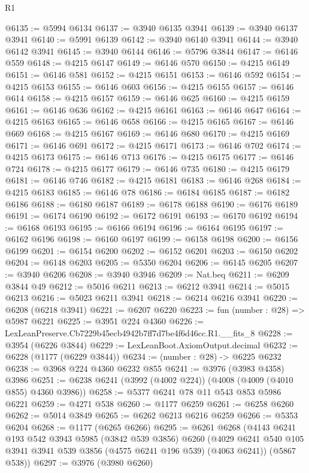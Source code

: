 \begin{lexlean}{R1}
\begin{coremodule}
@6135 := @5994 @6134
@6137 := @3940 @6135 @3941
@6139 := @3940 @6137 @3941
@6140 := @5991 @6139
@6142 := @3940 @6140 @3941
@6144 := @3940 @6142 @3941
@6145 := @3940 @6144
@6146 := @5796 @3844
@6147 := @6146 @559
@6148 := @4215 @6147
@6149 := @6146 @570
@6150 := @4215 @6149
@6151 := @6146 @581
@6152 := @4215 @6151
@6153 := @6146 @592
@6154 := @4215 @6153
@6155 := @6146 @603
@6156 := @4215 @6155
@6157 := @6146 @614
@6158 := @4215 @6157
@6159 := @6146 @625
@6160 := @4215 @6159
@6161 := @6146 @636
@6162 := @4215 @6161
@6163 := @6146 @647
@6164 := @4215 @6163
@6165 := @6146 @658
@6166 := @4215 @6165
@6167 := @6146 @669
@6168 := @4215 @6167
@6169 := @6146 @680
@6170 := @4215 @6169
@6171 := @6146 @691
@6172 := @4215 @6171
@6173 := @6146 @702
@6174 := @4215 @6173
@6175 := @6146 @713
@6176 := @4215 @6175
@6177 := @6146 @724
@6178 := @4215 @6177
@6179 := @6146 @735
@6180 := @4215 @6179
@6181 := @6146 @746
@6182 := @4215 @6181
@6183 := @6146 @268
@6184 := @4215 @6183
@6185 := @6146 @78
@6186 := @6184 @6185
@6187 := @6182 @6186
@6188 := @6180 @6187
@6189 := @6178 @6188
@6190 := @6176 @6189
@6191 := @6174 @6190
@6192 := @6172 @6191
@6193 := @6170 @6192
@6194 := @6168 @6193
@6195 := @6166 @6194
@6196 := @6164 @6195
@6197 := @6162 @6196
@6198 := @6160 @6197
@6199 := @6158 @6198
@6200 := @6156 @6199
@6201 := @6154 @6200
@6202 := @6152 @6201
@6203 := @6150 @6202
@6204 := @6148 @6203
@6205 := @5350 @6204
@6206 := @6145 @6205
@6207 := @3940 @6206
@6208 := @3940 @3946
@6209 := Nat.beq
@6211 := @6209 @3844 @49
@6212 := @5016 @6211
@6213 := @6212 @3941
@6214 := @5015 @6213
@6216 := @5023 @6211 @3941
@6218 := @6214 @6216 @3941
@6220 := @6208 (@6218 @3941)
@6221 := @6207 @6220
@6223 := fun (number : @28) => @5987 @6221
@6225 := @3951 @224 @4360
@6226 := LexLeanPreserve.Cb7229b45ecb4942b7ff7d7be4f6d46cc.R1.__fits_8
@6228 := @3954 (@6226 @3844)
@6229 := LexLeanBoot.AxiomOutput.decimal
@6232 := @6228 (@1177 (@6229 @3844))
@6234 := (number : @28) -> @6225 @6232
@6238 := @3968 @224 @4360 @6232 @855
@6241 := @3976 (@3983 @4358) @3986
@6251 := @6238 @6241 (@3992 (@4002 @224)) (@4008 (@4009 (@4010 @855) @4360 @3986))
@6258 := @5377 @6241 @78 @11 @543 @853 @5986 @6221
@6259 := @4271 @538
@6260 := @1177 @6259
@6261 := @6258 @6260
@6262 := @5014 @3849
@6265 := @6262 @6213 @6216 @6259
@6266 := @5353 @6204
@6268 := @1177 (@6265 @6266)
@6295 := @6261
    @6268
    (@4143
      @6241
      @193
      @542
      @3943
      @5985
      (@3842 @539 @3856)
      @6260
      (@4029 @6241 @540 @105 @3941 @3941 @539 @3856 (@4575 @6241 @196 @539) (@4063 @6241))
      (@5867 @538))
@6297 := @3976 (@3980 @6260)

\end{coremodule}
\end{lexlean}
